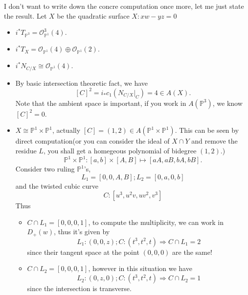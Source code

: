 \documentclass[../main.tex]{subfiles}
\begin{document}
\begin{example}
I don't want to write down the concre computation once more, let me just state the result. Let $X$ be the quadratic surface $X: xw-yz=0$
\begin{itemize}
\item $i^{*}T_{\mathbb{P}^{3}}=\mathcal{O}_{\mathbb{P}^{1}}^{3}(4).$
\item $i^{*}T_{X}=\mathcal{O}_{\mathbb{P}^{1}}(4)\oplus \mathcal{O}_{\mathbb{P}^{1}}(2).$
\item $i^{*}N_{C/X}\cong \mathcal{O}_{\mathbb{P}^{1}}(4).$
\item By basic intersection theoretic fact, we have
$$[C]^{2}=i_{*}c_{1}(N_{C/X}|_{C})=4\in A(X).$$
Note that the ambient space is important, if you work in $A(\mathbb{P}^{3})$, we know $[C]^{2}=0.$
\item $X\cong \mathbb{P}^{1}\times \mathbb{P}^{1}$, actually $[C]=(1,2)\in A(\mathbb{P}^{1}\times \mathbb{P}^{1}).$ This can be seen by direct computation(or you can consider the ideal of $X\cap Y$ and remove the residue $L$, you shall get a homegeous polynomial of bidegree $(1,2)$.) 
$$\mathbb{P}^{1}\times \mathbb{P}^{1}: [a, b]\times [A,B]\mapsto [aA,aB,bA,bB].$$
Consider two ruling $\mathbb{P}^{1}$'s, 
$$L_{1}=[0,0,A,B]; L_{2}=[0,a,0,b]$$
and the twisted cubic curve
$$C:[u^{3},u^{2}v,uv^{2},v^{3}]$$
Thus 
\begin{itemize}
\item $C\cap L_{1}=[0,0,0,1]$, to compute the multiplicity, we can work in $D_{+}(w)$, thus it's given by 
$$L_{1}: (0,0,z); C:(t^{3},t^{2},t)\Rightarrow C\cap L_{1}=2$$
since their tangent space at the point $(0,0,0)$ are the same!
\item $C\cap L_{2}=[0,0,0,1]$, however in this situation we have 
$$L_{2}: (0,z,0); C: (t^{3},t^{2},t)\Rightarrow C\cap L_{2}=1$$
since the intersection is transverse.
\end{itemize}


\end{itemize}
\end{example}
\end{document}
